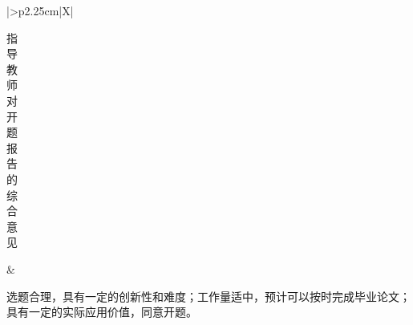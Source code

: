 ﻿\thispagestyle{plain}
\begingroup
{}
\setlength{\tabcolsep}{6pt}
\renewcommand{\arraystretch}{1.25}
\noindent\FrameTableIndent\begin{tabularx}{\FrameTabularWidth}{|>{\centering\arraybackslash}p{2.25cm}|X|}
  \hline
  \parbox[t][8.25cm][c]{2.05cm}{\centering 指\\导\\教\\师\\对\\开\\题\\报\\告\\的\\综\\合\\意\\见}
    & \parbox[t][8.25cm][t]{\linewidth}{选题合理，具有一定的创新性和难度；工作量适中，预计可以按时完成毕业论文；具有一定的实际应用价值，同意开题。

}
\end{tabularx}

